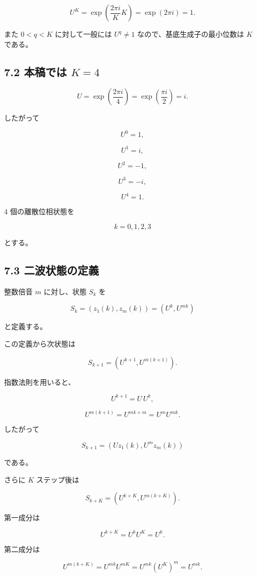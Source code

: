 \documentclass[
  a4paper,
]{ltjsarticle}
\begin{document}
\[
U^K
=
\exp\left(\frac{2\pi i}{K}K\right)
=
\exp(2\pi i)
=
1.
\]

また \(0<q<K\) に対して一般には \(U^q\ne1\)
なので、基底生成子の最小位数は \(K\) である。

\subsection{\texorpdfstring{7.2 本稿では
\(K=4\)}{7.2 本稿では K=4}}\label{ux672cux7a3fux3067ux306f-k4}

\[
U
=
\exp\left(\frac{2\pi i}{4}\right)
=
\exp\left(\frac{\pi i}{2}\right)
=i.
\]

したがって

\[
U^0=1,
\]

\[
U^1=i,
\]

\[
U^2=-1,
\]

\[
U^3=-i,
\]

\[
U^4=1.
\]

4 個の離散位相状態を

\[
k=0,1,2,3
\]

とする。

\subsection{7.3
二波状態の定義}\label{ux4e8cux6ce2ux72b6ux614bux306eux5b9aux7fa9}

整数倍音 \(m\) に対し、状態 \(S_k\) を

\[
\boxed{
S_k
=
\left(z_1(k),z_m(k)\right)
=
\left(U^k,U^{mk}\right)
}
\]

と定義する。

この定義から次状態は

\[
S_{k+1}
=
\left(U^{k+1},U^{m(k+1)}\right).
\]

指数法則を用いると、

\[
U^{k+1}
=
U\,U^k,
\]

\[
U^{m(k+1)}
=
U^{mk+m}
=
U^m U^{mk}.
\]

したがって

\[
\boxed{
S_{k+1}
=
\left(U z_1(k),U^m z_m(k)\right)
}
\]

である。

さらに \(K\) ステップ後は

\[
S_{k+K}
=
\left(U^{k+K},U^{m(k+K)}\right).
\]

第一成分は

\[
U^{k+K}
=
U^k U^K
=
U^k.
\]

第二成分は

\[
U^{m(k+K)}
=
U^{mk}U^{mK}
=
U^{mk}(U^K)^m
=
U^{mk}.
\]
\end{document}
